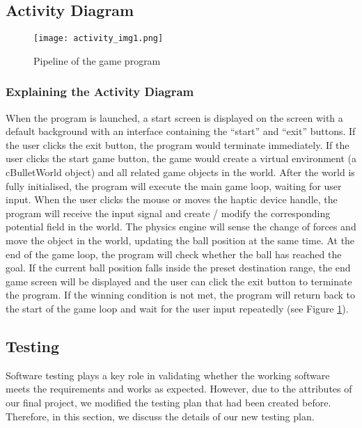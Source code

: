 \documentclass[a4paper]{article}
\begin{document}
\subsection{Activity Diagram}

\begin{figure}[H]
    \centering
    \texttt{[image: activity\_img1.png]}
    \caption{Pipeline of the game program}
    \label{fig:activity_img1}
\end{figure}
\subsubsection{Explaining the Activity Diagram}
When the program is launched, a start screen is displayed on the screen with a default background with an interface containing the “start” and “exit” buttons. If the user clicks the exit button, the program would terminate immediately. If the user clicks the start game button, the game would create a virtual environment (a cBulletWorld object) and all related game objects in the world. After the world is fully initialised, the program will execute the main game loop, waiting for user input. When the user clicks the mouse or moves the haptic device handle, the program will receive the input signal and create / modify the corresponding potential field in the world. The physics engine will sense the change of forces and move the object in the world, updating the ball position at the same time. At the end of the game loop, the program will check whether the ball has reached the goal. If the current ball position falls inside the preset destination range, the end game screen will be displayed and the user can click the exit button to terminate the program. If the winning condition is not met, the program will return back to the start of the game loop and wait for the user input repeatedly (see Figure \ref{fig:activity_img1}). 

\subsection{Testing}
Software testing plays a key role in validating whether the working software meets the requirements and works as expected. However, due to the attributes of our final project, we modified the testing plan that had been created before. Therefore, in this section, we discuss the details of our new testing plan. 
\end{document}
